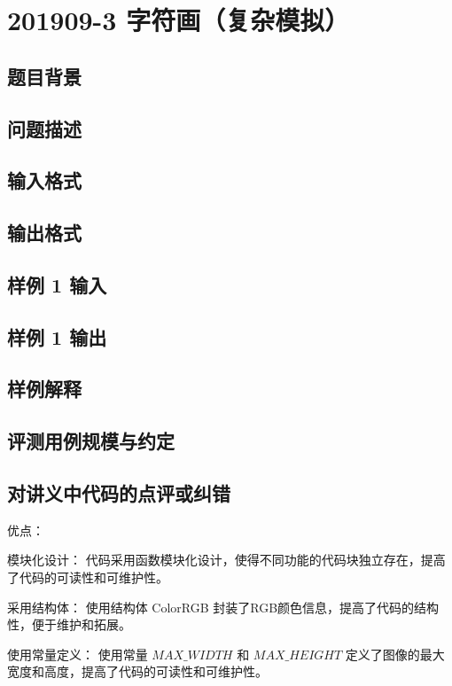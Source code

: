 \section{201909-3 字符画（复杂模拟）}

\subsection{题目背景}

\subsection{问题描述}

\subsection{输入格式}

\subsection{输出格式}

\subsection{样例 1 输入}

\subsection{样例 1 输出}

\subsection{样例解释}

\subsection{评测用例规模与约定}

\subsection{对讲义中代码的点评或纠错}
 
优点：

模块化设计： 代码采用函数模块化设计，使得不同功能的代码块独立存在，提高了代码的可读性和可维护性。

采用结构体： 使用结构体 ColorRGB 封装了RGB颜色信息，提高了代码的结构性，便于维护和拓展。

使用常量定义： 使用常量 $MAX\_WIDTH$ 和 $MAX\_HEIGHT$ 定义了图像的最大宽度和高度，提高了代码的可读性和可维护性。

